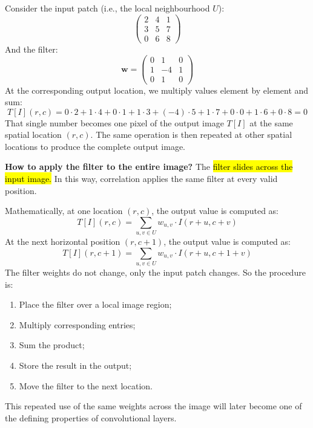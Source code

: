 \highspace
\begin{examplebox}
    Consider the input patch (i.e., the local neighbourhood $U$):
    \begin{equation*}
        \begin{pmatrix}
            2 & 4 & 1 \\
            3 & 5 & 7 \\
            0 & 6 & 8
        \end{pmatrix}
    \end{equation*}
    And the filter:
    \begin{equation*}
        \mathbf{w} = \begin{pmatrix}
            0 & 1 & 0 \\
            1 & -4 & 1 \\
            0 & 1 & 0
        \end{pmatrix}
    \end{equation*}
    At the corresponding output location, we multiply values element by element and sum:
    \begin{equation*}
        T\left[I\right]\left(r,c\right) =
        0 \cdot 2 +
        1 \cdot 4 +
        0 \cdot 1 +
        1 \cdot 3 +
        (-4) \cdot 5 +
        1 \cdot 7 +
        0 \cdot 0 +
        1 \cdot 6 +
        0 \cdot 8
        = 0
    \end{equation*}
    That single number becomes one pixel of the output image $T[I]$ at the same spatial location $(r,c)$. The same operation is then repeated at other spatial locations to produce the complete output image.
\end{examplebox}

\highspace
\textcolor{Green3}{ \textbf{How to apply the filter to the entire image?}} The \hl{filter slides across the input image.} In this way, correlation applies the same filter at every valid position.

\highspace
Mathematically, at one location $(r,c)$, the output value is computed as:
\begin{equation*}
    T\left[I\right]\left(r,c\right) = \sum_{u,v \in U} w_{u,v} \cdot I\left(r+u, c+v\right)
\end{equation*}
At the next horizontal position $(r,c+1)$, the output value is computed as:
\begin{equation*}
    T\left[I\right]\left(r,c+1\right) = \sum_{u,v \in U} w_{u,v} \cdot I\left(r+u, c+1+v\right)
\end{equation*}
The filter weights do not change, only the input patch changes. So the procedure is:
\begin{enumerate}
    \item Place the filter over a local image region;
    \item Multiply corresponding entries;
    \item Sum the product;
    \item Store the result in the output;
    \item Move the filter to the next location.
\end{enumerate}
This repeated use of the same weights across the image will later become one of the defining properties of convolutional layers.

